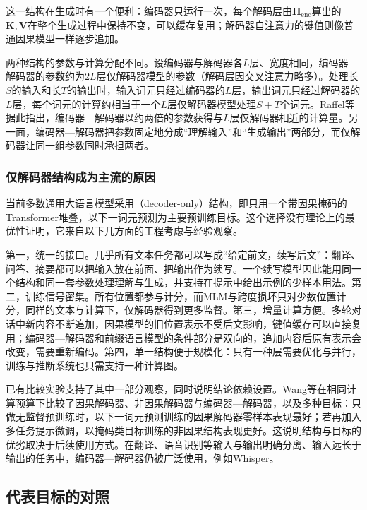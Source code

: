 这一结构在生成时有一个便利：编码器只运行一次，每个解码层由$\bm H_{\mathrm{enc}}$算出的$\bm K,\bm V$在整个生成过程中保持不变，可以缓存复用；解码器自注意力的键值则像普通因果模型一样逐步追加。

两种结构的参数与计算分配不同。设编码器与解码器各$L$层、宽度相同，编码器—解码器的参数约为$2L$层仅解码器模型的参数（解码层因交叉注意力略多）。处理长$S$的输入和长$T$的输出时，输入词元只经过编码器的$L$层，输出词元只经过解码器的$L$层，每个词元的计算约相当于一个$L$层仅解码器模型处理$S+T$个词元。Raffel等据此指出，编码器—解码器以约两倍的参数获得与$L$层仅解码器相近的计算量。另一面，编码器—解码器把参数固定地分成“理解输入”和“生成输出”两部分，而仅解码器让同一组参数同时承担两者。

\subsubsection{仅解码器结构成为主流的原因}
\label{sec:nlp-llm-objective-decoder-only}

当前多数通用大语言模型采用（decoder-only）结构，即只用一个带因果掩码的Transformer堆叠，以下一词元预测为主要预训练目标。这个选择没有理论上的最优性证明，它来自以下几方面的工程考虑与经验观察。

第一，统一的接口。几乎所有文本任务都可以写成“给定前文，续写后文”：翻译、问答、摘要都可以把输入放在前面、把输出作为续写。一个续写模型因此能用同一个结构和同一套参数处理理解与生成，并支持在提示中给出示例的少样本用法。第二，训练信号密集。所有位置都参与计分，而MLM与跨度损坏只对少数位置计分，同样的文本与计算下，仅解码器得到更多监督。第三，增量计算方便。多轮对话中新内容不断追加，因果模型的旧位置表示不受后文影响，键值缓存可以直接复用；编码器—解码器和前缀语言模型的条件部分是双向的，追加内容后原有表示会改变，需要重新编码。第四，单一结构便于规模化：只有一种层需要优化与并行，训练与推断系统也只需支持一种计算图。

已有比较实验支持了其中一部分观察，同时说明结论依赖设置。Wang等在相同计算预算下比较了因果解码器、非因果解码器与编码器—解码器，以及多种目标：只做无监督预训练时，以下一词元预测训练的因果解码器零样本表现最好；若再加入多任务提示微调，以掩码类目标训练的非因果结构表现更好。这说明结构与目标的优劣取决于后续使用方式。在翻译、语音识别等输入与输出明确分离、输入远长于输出的任务中，编码器—解码器仍被广泛使用，例如Whisper。

\subsection{代表目标的对照}
\label{sec:nlp-llm-objective-comparison}

